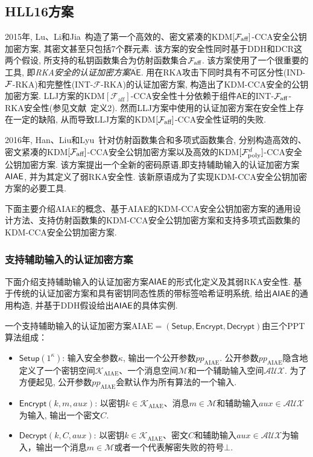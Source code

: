 \subsection{HLL16方案}
2015年, Lu、Li和Jia~\cite{LLJ2015}构造了第一个高效的、密文紧凑的KDM$[\mathcal{F}_{\text{aff}}]$-CCA安全公钥加密方案, 其密文甚至只包括7个群元素. 该方案的安全性同时基于DDH和DCR这两个假设, 所支持的私钥函数集合为仿射函数集合$\mathcal{F}_{\text{aff}}$. 该方案使用了一个很重要的工具, 即\emph{RKA安全的认证加密方案$\overline{\mathsf{AE}}$}. 用在RKA攻击下同时具有不可区分性(IND-${\mathcal{F}}$-RKA)和完整性(INT-$\mathcal{F}$-RKA)的认证加密方案, 构造出了KDM-CCA安全的公钥加密方案. LLJ方案的KDM$[\mathcal{F}_{\text{aff}}]$-CCA安全性十分依赖于组件$\overline{\mathsf{AE}}$的INT-$\mathcal{F}_{\text{aff}}$-RKA安全性(参见文献~\cite{LLJ2015}定义2). 然而LLJ方案中使用的认证加密方案在安全性上存在一定的缺陷, 从而导致LLJ方案的KDM$[\mathcal{F}_{\text{aff}}]$-CCA安全性证明的失败.

2016年, Han、Liu和Lyu~\cite{HLL-ASIACRYPT-2016}针对仿射函数集合和多项式函数集合, 分别构造高效的、密文紧凑的KDM$[{\mathcal{F}_{\text{aff}}}]$-CCA安全公钥加密方案以及高效的KDM$[\mathcal{F}_{\text{poly}}^{d}]$-CCA安全公钥加密方案. 该方案提出一个全新的密码原语,即支持辅助输入的认证加密方案$\mathsf{AIAE}$, 并为其定义了弱RKA安全性. 该新原语成为了实现KDM-CCA安全公钥加密方案的必要工具.

下面主要介绍AIAE的概念、基于AIAE的KDM-CCA安全公钥加密方案的通用设计方法、支持仿射函数集的KDM-CCA安全公钥加密方案和支持多项式函数集的KDM-CCA安全公钥加密方案.

\subsubsection{支持辅助输入的认证加密方案}
下面介绍支持辅助输入的认证加密方案$\mathsf{AIAE}$的形式化定义及其弱RKA安全性. 基于传统的认证加密方案和具有密钥同态性质的带标签哈希证明系统, 给出$\mathsf{AIAE}$的通用构造, 并基于DDH假设给出$\mathsf{AIAE}$的具体实例.

\begin{definition}[支持辅助输入的认证加密方案]\label{defn:AIAE}
一个支持辅助输入的认证加密方案$\text{AIAE} = (\mathsf{Setup}, \mathsf{Encrypt}, \mathsf{Decrypt})$由三个PPT算法组成：
\begin{itemize}
\item $\mathsf{Setup}(1^\kappa)$: 输入安全参数$\kappa$, 输出一个公开参数$pp_{\text{AIAE}}$. 公开参数$pp_{\text{AIAE}}$隐含地定义了一个密钥空间$\mathcal{K}_{\text{AIAE}}$、一个消息空间$\mathcal{M}$和一个辅助输入空间$\mathcal{AUX}$. 为了方便起见, 公开参数$pp_{\text{AIAE}}$会默认作为所有算法的一个输入.
\item $\mathsf{Encrypt}(k, m, aux)$: 以密钥$k \in \mathcal{K}_{\text{AIAE}}$、消息$m \in \mathcal{M}$和辅助输入$aux \in \mathcal{AUX}$为输入, 输出一个密文$C$.
\item $\mathsf{Decrypt}(k, C, aux)$: 以密钥$k \in \mathcal{K}_{\text{AIAE}}$、密文$C$和辅助输入$aux \in \mathcal{AUX}$为输入，输出一个消息$m \in \mathcal{M}$或者一个代表解密失败的符号$\bot$.
\end{itemize}
\end{definition}

